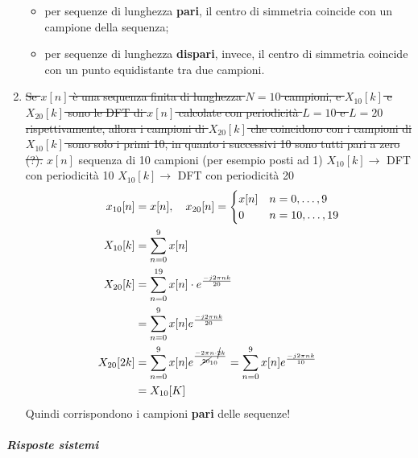 \documentclass[
]{article}
\providecommand{\tightlist}{%
  \setlength{\itemsep}{0pt}\setlength{\parskip}{0pt}}
\begin{document}
\begin{enumerate}
  \begin{itemize}
  \tightlist
  \item
    per sequenze di lunghezza \textbf{pari}, il centro di simmetria
    coincide con un campione della sequenza;
  \item
    per sequenze di lunghezza \textbf{dispari}, invece, il centro di
    simmetria coincide con un punto equidistante tra due campioni.
  \end{itemize}
\item
  \st{Se $x[n]$ è una sequenza finita di lunghezza $N=10$ campioni,
  e $X_{10}[k]$ e $X_{20}[k]$ sono le DFT di $x[n]$ calcolate con
  periodicità $L=10$ e $L=20$ rispettivamente, allora i campioni di
  $X_{20}[k]$ che coincidono con i campioni di $X_{10}[k]$ sono solo
  i primi 10, in quanto i successivi 10 sono tutti pari a zero (?).}
  \newline \(x[n]\) sequenza di 10 campioni (per esempio posti ad 1)
  \newline \(X_{10}[k] \rightarrow\) DFT con periodicità 10 \newline
  \(X_{10}[k] \rightarrow\) DFT con periodicità 20 \newline
  \begin{align*}
  x_{10}[n]&=x[n], \quad 
  x_{20}[n] = \begin{cases}x[n] & n=0,\dots,9 \\
  0 & n=10,\dots,19\end{cases} \\
  X_{10}[k]&=\sum_{n=0}^9 x[n]  \\
  X_{20}[k]&=\sum_{n=0}^{19} x[n] \cdot e^{\frac{-j2\pi nk}{20}} \\
  & =\sum_{n=0}^9 x[n] e^{\frac{-j2\pi nk}{20}} \\
  X_{20}[2k]&=\sum_{n=0}^9 x[n] e^{\frac{-2 \pi n \cdot \cancel{2}k}{\cancel{20}_{10}}}
   =\sum_{n=0}^{9} x[n] e^{\frac{-j2\pi nk}{10}} \\
  & =X_{10}[K] \\
  \end{align*} Quindi corrispondono i campioni \textbf{pari} delle
  sequenze!
\end{enumerate}

\subparagraph{Risposte sistemi}\label{risposte-sistemi}
\end{document}
